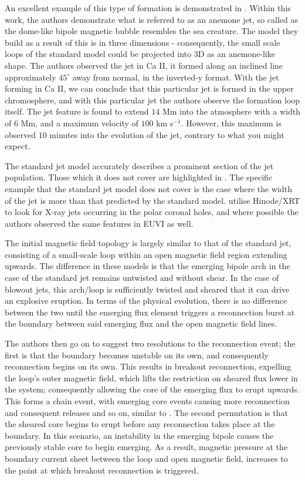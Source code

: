 An excellent example of this type of formation is demonstrated in \cite{Nishizuka2011}.
Within this work, the authors demonstrate what is referred to as an anemone jet, so called as the dome-like bipole magnetic bubble resembles the sea creature.
The model they build as a result of this is in three dimensions - consequently, the small scale loops of the standard model could be projected into $3$D as an anemone-like shape.
The authors observed the jet in Ca II, it formed along an inclined line approximately $45^\circ$ away from normal, in the inverted-y format.
With the jet forming in Ca II, we can conclude that this particular jet is formed in the upper chromosphere, and with this particular jet the authors observe the formation loop itself.
The jet feature is found to extend $14$ Mm into the atmosphere with a width of $6$ Mm, and a maximum velocity of $100$ km s$^{-1}$.
However, this maximum is observed $10$ minutes into the evolution of the jet, contrary to what you might expect.

The standard jet model accurately describes a prominent section of the jet population.
Those which it does not cover are highlighted in \cite{Moore2010}.
The specific example that the standard jet model does not cover is the case where the width of the jet is more than that predicted by the standard model.
\cite{Moore2010} utilise Hinode/XRT to look for X-ray jets occurring in the polar coronal holes, and where possible the authors observed the same features in EUVI as well.

The initial magnetic field topology is largely similar to that of the standard jet, consisting of a small-scale loop within an open magnetic field region extending upwards.
The difference in these models is that the emerging bipole arch in the case of the standard jet remains untwisted and without shear.
In the case of blowout jets, this arch/loop is sufficiently twisted and sheared that it can drive an explosive eruption.
In terms of the physical evolution, there is no difference between the two until the emerging flux element triggers a reconnection burst at the boundary between said emerging flux and the open magnetic field lines.

The authors then go on to suggest two resolutions to the reconnection event; the first is that the boundary becomes unstable on its own, and consequently reconnection begins on its own.
This results in breakout reconnection, expelling the loop's outer magnetic field, which lifts the restriction on sheared flux lower in the system; consequently allowing the core of the emerging flux to erupt upwards.
This forms a chain event, with emerging core events causing more reconnection and consequent releases and so on, similar to \cite{Antiochos1998}.
The second permutation is that the sheared core begins to erupt before any reconnection takes place at the boundary.
In this scenario, an instability in the emerging bipole causes the previously stable core to begin emerging.
As a result, magnetic pressure at the boundary current sheet between the loop and open magnetic field, increases to the point at which breakout reconnection is triggered.

